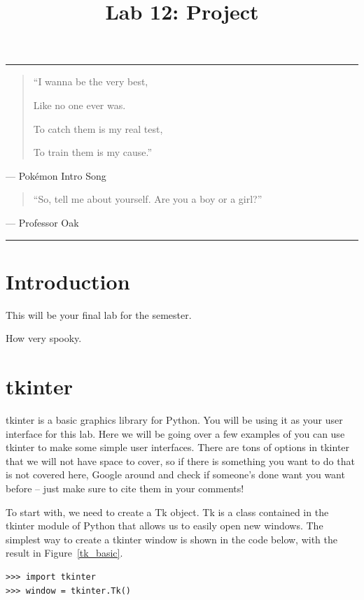 \documentclass[11pt]{cselabheader}
\title{Lab 12: Project}
\begin{document}
\maketitle

\hrule
\begin{quotation}
  ``I wanna be the very best,
  
  Like no one ever was.
  
  To catch them is my real test,
  
  To train them is my cause.''
\end{quotation}
\begin{flushright}
--- Pok\'emon Intro Song
\end{flushright}


\begin{quotation}
``So, tell me about yourself. Are you a boy or a girl?''
\end{quotation}
\begin{flushright}
--- Professor Oak
\end{flushright}

\hrule

\section{Introduction}
This will be your final lab for the semester.

\vspace{3in}
How very spooky.


\pagebreak

\section{tkinter}
\label{sec:tk}
tkinter is a basic graphics library for Python. You will be using it as your
user interface for this lab. Here we will be going over a few examples of
you can use tkinter to make some simple user interfaces. There are tons of
options in tkinter that we will not have space to cover, so if there is
something you want to do that is not covered here, Google around and check
if someone's done want you want before -- just make sure to cite them in
your comments!

To start with, we need to create a Tk object. Tk is a class contained in
the tkinter module of Python that allows us to easily open new windows.
The simplest way to create a tkinter window is shown in the code below,
with the result in Figure~\ref{tk_basic}.

\begin{lstlisting}[style=ipython]
>>> import tkinter
>>> window = tkinter.Tk()
\end{lstlisting}
\end{document}
